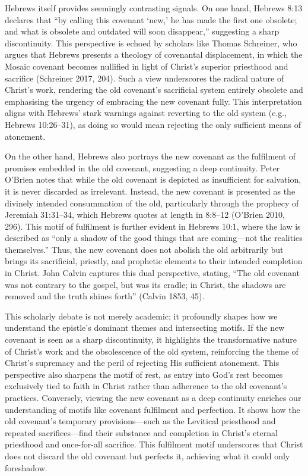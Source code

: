 \documentclass[12pt]{article}
\begin{document}
Hebrews itself provides seemingly contrasting signals. On one hand, Hebrews 8:13
declares that ``by calling this covenant ‘new,’ he has made the first one
obsolete; and what is obsolete and outdated will soon disappear,'' suggesting a
sharp discontinuity. This perspective is echoed by scholars like Thomas
Schreiner, who argues that Hebrews presents a theology of covenantal
displacement, in which the Mosaic covenant becomes nullified in light of
Christ’s superior priesthood and sacrifice (Schreiner 2017, 204). Such a view
underscores the radical nature of Christ’s work, rendering the old covenant’s
sacrificial system entirely obsolete and emphasising the urgency of embracing
the new covenant fully. This interpretation aligns with Hebrews’ stark warnings
against reverting to the old system (e.g., Hebrews 10:26--31), as doing so would
mean rejecting the only sufficient means of atonement.

On the other hand, Hebrews also portrays the new covenant as the fulfilment of
promises embedded in the old covenant, suggesting a deep continuity. Peter
O’Brien notes that while the old covenant is depicted as insufficient for
salvation, it is never discarded as irrelevant. Instead, the new covenant is
presented as the divinely intended consummation of the old, particularly through
the prophecy of Jeremiah 31:31--34, which Hebrews quotes at length in 8:8--12
(O’Brien 2010, 296). This motif of fulfilment is further evident in Hebrews
10:1, where the law is described as ``only a shadow of the good things that are
coming---not the realities themselves.'' Thus, the new covenant does not abolish
the old arbitrarily but brings its sacrificial, priestly, and prophetic elements
to their intended completion in Christ. John Calvin captures this dual
perspective, stating, ``The old covenant was not contrary to the gospel, but was
its cradle; in Christ, the shadows are removed and the truth shines forth''
(Calvin 1853, 45).

This scholarly debate is not merely academic; it profoundly shapes how we
understand the epistle’s dominant themes and intersecting motifs. If the new
covenant is seen as a sharp discontinuity, it highlights the transformative
nature of Christ’s work and the obsolescence of the old system, reinforcing the
theme of Christ’s supremacy and the peril of rejecting His sufficient atonement.
This perspective also sharpens the motif of rest, as entry into God’s rest
becomes exclusively tied to faith in Christ rather than adherence to the old
covenant’s practices. Conversely, viewing the new covenant as a deep continuity
enriches our understanding of motifs like covenant fulfilment and perfection. It
shows how the old covenant’s temporary provisions—such as the Levitical
priesthood and repeated sacrifices—find their substance and completion in
Christ’s eternal priesthood and once-for-all sacrifice. This fulfilment motif
underscores that Christ does not discard the old covenant but perfects it,
achieving what it could only foreshadow.
\end{document}
